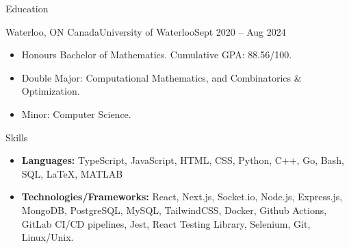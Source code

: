 \documentclass[]{mcdowellcv}
\begin{document}
	\begin{cvsection}{Education}
		\begin{cvsubsection}{Waterloo, ON Canada}{University of Waterloo}{Sept 2020 -- Aug 2024}
			\begin{itemize}
				\item Honours Bachelor of Mathematics. Cumulative GPA: 88.56/100.
				\item Double Major: Computational Mathematics, and Combinatorics \& Optimization.
				\item Minor: Computer Science.
			\end{itemize}
		\end{cvsubsection}
	\end{cvsection}
	\begin{cvsection}{Skills}
		\begin{cvsubsection}{}{}{}	
			\begin{itemize}
				\item \textbf{Languages:} TypeScript, JavaScript, HTML, CSS, Python, C++, Go, Bash, SQL, LaTeX, MATLAB
				\item \textbf{Technologies/Frameworks:} React, Next.js, Socket.io, Node.js, Express.js, MongoDB, PostgreSQL, MySQL, TailwindCSS, Docker, Github Actions, GitLab CI/CD pipelines, Jest, React Testing Library, Selenium, Git, Linux/Unix.
			\end{itemize}
		\end{cvsubsection}
	\end{cvsection}
	
\end{document}
